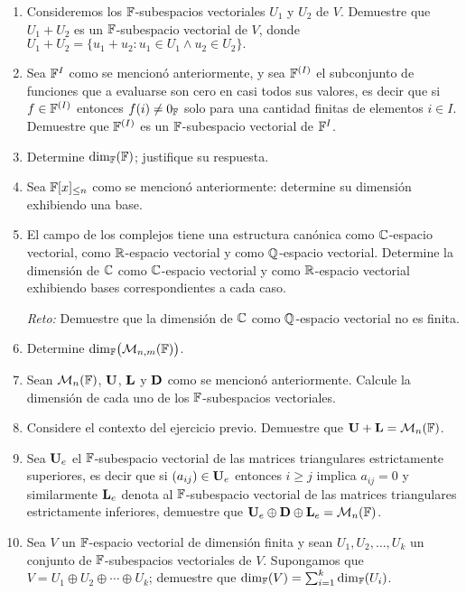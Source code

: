 \begin{enumerate}
  \item Consideremos los $\mathbb{F}$-subespacios vectoriales $U_1$ y $U_2$ de $V$. Demuestre que $U_1 + U_2$ es un $\mathbb{F}$-subespacio vectorial de $V$, donde $U_1 + U_2 = \{ u_1 + u_2 : u_1 \in U_1 \land u_2 \in U_2 \}.$
  
  \item Sea $\mathbb{F}^{I}$ como se mencionó anteriormente, y sea $\mathbb{F}^{(I)}$ el subconjunto de funciones que a evaluarse son cero en casi todos sus valores, es decir que si $f \in \mathbb{F}^{(I)}$ entonces $f(i) \neq 0_{\mathbb{F}}$ solo para una cantidad finitas de elementos $i \in I$. Demuestre que $\mathbb{F}^{(I)}$ es un $\mathbb{F}$-subespacio vectorial de $\mathbb{F}^{I}$.
  
  \item Determine $\dim_{\mathbb{F}}(\mathbb{F})$; justifique su respuesta.
  
  \item Sea $\mathbb{F}[x]_{\leq n}$ como se mencionó anteriormente: determine su dimensión exhibiendo una base.
  
  \item El campo de los complejos tiene una estructura canónica como $\mathbb{C}$-espacio vectorial, como $\mathbb{R}$-espacio vectorial
  y como $\mathbb{Q}$-espacio vectorial. Determine la dimensión de $\mathbb{C}$ como $\mathbb{C}$-espacio vectorial y como $\mathbb{R}$-espacio vectorial exhibiendo bases correspondientes a cada caso.
  
  \emph{Reto:} Demuestre que la dimensión de $\mathbb{C}$ como $\mathbb{Q}$-espacio vectorial no es finita.
  
  \item Determine $\dim_{\mathbb{F}}\bigl( \mathcal{M}_{n,m}(\mathbb{F}) \bigr)$.
  
  \item Sean $\mathcal{M}_n(\mathbb{F})$, $\mathbf{U}$, $\mathbf{L}$ y $\mathbf{D}$ como se mencionó anteriormente. Calcule la dimensión de cada uno de los $\mathbb{F}$-subespacios vectoriales.

  \item Considere el contexto del ejercicio previo. Demuestre que $\mathbf{U} + \mathbf{L} = \mathcal{M}_n(\mathbb{F})$.
  
  \item Sea $\mathbf{U}_e$ el $\mathbb{F}$-subespacio vectorial de las matrices triangulares estrictamente superiores, es decir que si  $(a_{ij}) \in \mathbf{U}_e$ entonces $i \geq j$ implica $a_{ij} = 0$ y similarmente $\mathbf{L}_e$ denota al $\mathbb{F}$-subespacio vectorial de las matrices triangulares estrictamente inferiores, demuestre que $\mathbf{U}_e \oplus \mathbf{D} \oplus \mathbf{L}_e = \mathcal{M}_n(\mathbb{F})$.
  
  \item Sea $V$ un $\mathbb{F}$-espacio vectorial de dimensión finita y sean $U_1, U_2, \ldots, U_k$ un conjunto de $\mathbb{F}$-subespacios vectoriales de $V$. Supongamos que $V = U_1 \oplus U_2 \oplus \cdots \oplus U_k$; demuestre que $\dim_{\mathbb{F}}(V) = \sum _{i=1}^k \dim_{\mathbb{F}}(U_i)$.
  

\end{enumerate}
